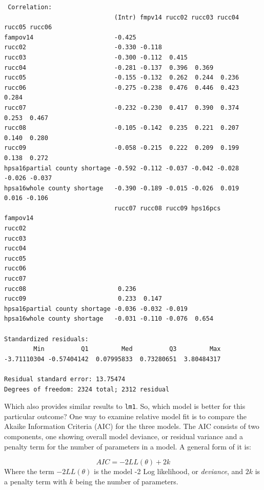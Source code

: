 \documentclass[
  letterpaper,
  DIV=11,
  numbers=noendperiod]{scrreprt}
\begin{document}
\begin{verbatim}
 Correlation: 
                              (Intr) fmpv14 rucc02 rucc03 rucc04 rucc05 rucc06
fampov14                      -0.425                                          
rucc02                        -0.330 -0.118                                   
rucc03                        -0.300 -0.112  0.415                            
rucc04                        -0.281 -0.137  0.396  0.369                     
rucc05                        -0.155 -0.132  0.262  0.244  0.236              
rucc06                        -0.275 -0.238  0.476  0.446  0.423  0.284       
rucc07                        -0.232 -0.230  0.417  0.390  0.374  0.253  0.467
rucc08                        -0.105 -0.142  0.235  0.221  0.207  0.140  0.280
rucc09                        -0.058 -0.215  0.222  0.209  0.199  0.138  0.272
hpsa16partial county shortage -0.592 -0.112 -0.037 -0.042 -0.028 -0.026 -0.037
hpsa16whole county shortage   -0.390 -0.189 -0.015 -0.026  0.019  0.016 -0.106
                              rucc07 rucc08 rucc09 hps16pcs
fampov14                                                   
rucc02                                                     
rucc03                                                     
rucc04                                                     
rucc05                                                     
rucc06                                                     
rucc07                                                     
rucc08                         0.236                       
rucc09                         0.233  0.147                
hpsa16partial county shortage -0.036 -0.032 -0.019         
hpsa16whole county shortage   -0.031 -0.110 -0.076  0.654  

Standardized residuals:
        Min          Q1         Med          Q3         Max 
-3.71110304 -0.57404142  0.07995833  0.73280651  3.80484317 

Residual standard error: 13.75474 
Degrees of freedom: 2324 total; 2312 residual
\end{verbatim}

Which also provides similar results to \texttt{lm1}. So, which model is
better for this particular outcome? One way to examine relative model
fit is to compare the Akaike Information Criteria (AIC) for the three
models. The AIC consists of two components, one showing overall model
deviance, or residual variance and a penalty term for the number of
parameters in a model. A general form of it is:

\[
AIC = -2LL(\theta) + 2k
\] Where the term \(-2LL(\theta)\) is the model -2 Log likelihood, or
\emph{deviance}, and \(2k\) is a penalty term with \(k\) being the
number of parameters.
\end{document}
